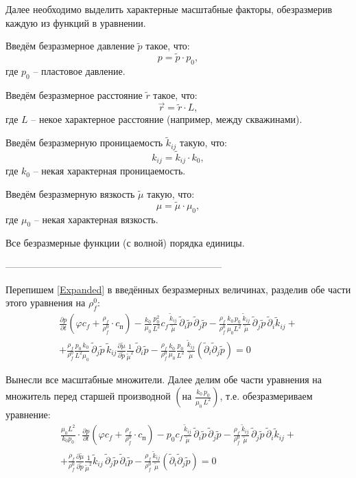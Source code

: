 \documentclass[a4paper,12pt]{article}
\newcommand{\beq}{\begin{equation}}
\newcommand{\eeq}{\end{equation}}
\begin{document}
Далее необходимо выделить характерные масштабные факторы, обезразмерив каждую из функций в уравнении.

Введём безразмерное давление $\tilde{p}$ такое, что:
\beq
p=\tilde{p}\cdot p_0,
\eeq
где $p_0$ -- пластовое давление.

Введём безразмерное расстояние $\tilde{r}$ такое, что:
\beq
\vec{r}=\tilde{r}\cdot L,
\eeq
где $L$ -- некое характерное расстояние (например, между скважинами).

Введём безразмерную проницаемость $\tilde{k}_{ij}$ такую, что:
\beq
k_{ij}=\tilde{k}_{ij}\cdot k_0,
\eeq
где $k_0$ -- некая характерная проницаемость.

Введём безразмерную вязкость $\tilde{\mu}$ такую, что:
\beq
\mu=\tilde{\mu}\cdot\mu_0,
\eeq
где $\mu_0$ -- некая характерная вязкость.

Все безразмерные функции (с волной) порядка единицы.

--------------------------------------------------------------------

Перепишем \eqref{Expanded} в введённых безразмерных величинах, разделив обе части этого уравнения на $\rho_f^0$:
\begin{multline}
\frac{\partial p}{\partial t}\left(\varphi c_f+\frac{\rho_f}{\rho_f^0}\cdot c_\text{п}\right)-\frac{k_0}{\mu_0}\frac{p_0^2}{L^2}c_f\frac{\tilde{k}_{ij}}{\tilde{\mu}}\,\tilde{\partial}_i\tilde{p}\,\tilde{\partial}_j\tilde{p}-\frac{\rho_f}{\rho_f^0}\frac{k_0\,p_0}{\mu_0L^2}\frac{\tilde{k}_{ij}}{\tilde{\mu}}\,\tilde{\partial}_j\tilde{p}\,\tilde{\partial}_i\tilde{k}_{ij}+\\+\frac{\rho_f}{\rho_f^0}\frac{p_0\,k_0}{L^2\mu_0}\,\tilde{\partial}_j\tilde{p}\,\tilde{k}_{ij}\frac{\partial\tilde{\mu}}{\partial\tilde{p}}\frac{1}{\tilde{\mu}^2}\,\tilde{\partial}_i\tilde{p}-\frac{\rho_f}{\rho_f^0}\frac{k_0}{\mu_0}\frac{p_0}{L^2}\,\frac{\tilde{k}_{ij}}{\tilde{\mu}}\left(\tilde{\partial}_i\tilde{\partial}_j\tilde{p}\right)=0
\end{multline}

Вынесли все масштабные множители. Далее делим обе части уравнения на множитель перед старшей производной $\left(\text{на }\frac{k_0\,p_0}{\mu_0\,L^2}\right)$, т.е. обезразмериваем уравнение:
\begin{multline}\label{PiezoEqDiv}
\frac{\mu_0L^2}{k_0p_0}\cdot\frac{\partial p}{\partial t}\left(\varphi c_f+\frac{\rho_f}{\rho_f^0}\cdot c_\text{п}\right)-p_0c_f\frac{\tilde{k}_{ij}}{\tilde{\mu}}\,\tilde{\partial}_i\tilde{p}\,\tilde{\partial}_j\tilde{p}-\frac{\rho_f}{\rho_f^0}\frac{\tilde{k}_{ij}}{\tilde{\mu}}\,\tilde{\partial}_j\tilde{p}\,\tilde{\partial}_i\tilde{k}_{ij}+\\+\frac{\rho_f}{\rho_f^0}\frac{\partial\tilde{\mu}}{\partial\tilde{p}}\frac{1}{\tilde{\mu}^2}\tilde{k}_{ij}\,\tilde{\partial}_j\tilde{p}\,\tilde{\partial}_i\tilde{p}-\frac{\rho_f}{\rho_f^0}\frac{\tilde{k}_{ij}}{\tilde{\mu}}\left(\tilde{\partial}_i\tilde{\partial}_j\tilde{p}\right)=0
\end{multline}
\end{document}
